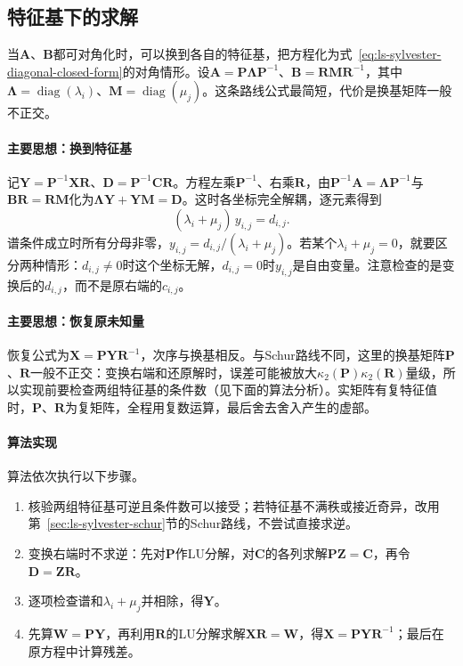 \subsection{特征基下的求解}
\label{sec:ls-sylvester-diagonalizable}

当$\bm A$、$\bm B$都可对角化时，可以换到各自的特征基，把方程化为式~\eqref{eq:ls-sylvester-diagonal-closed-form}的对角情形。设$\bm A=\bm P\bm\Lambda\bm P^{-1}$、$\bm B=\bm R\bm M\bm R^{-1}$，其中$\bm\Lambda=\operatorname{diag}(\lambda_i)$、$\bm M=\operatorname{diag}(\mu_j)$。这条路线公式最简短，代价是换基矩阵一般不正交。

\paragraph{主要思想：换到特征基}
记$\bm Y=\bm P^{-1}\bm X\bm R$、$\bm D=\bm P^{-1}\bm C\bm R$。方程左乘$\bm P^{-1}$、右乘$\bm R$，由$\bm P^{-1}\bm A=\bm\Lambda\bm P^{-1}$与$\bm B\bm R=\bm R\bm M$化为$\bm\Lambda\bm Y+\bm Y\bm M=\bm D$。这时各坐标完全解耦，逐元素得到
\[
 (\lambda_i+\mu_j)\,y_{i,j}=d_{i,j}.
\]
谱条件成立时所有分母非零，$y_{i,j}=d_{i,j}/(\lambda_i+\mu_j)$。若某个$\lambda_i+\mu_j=0$，就要区分两种情形：$d_{i,j}\neq0$时这个坐标无解，$d_{i,j}=0$时$y_{i,j}$是自由变量。注意检查的是变换后的$d_{i,j}$，而不是原右端的$c_{i,j}$。

\paragraph{主要思想：恢复原未知量}
恢复公式为$\bm X=\bm P\bm Y\bm R^{-1}$，次序与换基相反。与Schur路线不同，这里的换基矩阵$\bm P$、$\bm R$一般不正交：变换右端和还原解时，误差可能被放大$\kappa_2(\bm P)\kappa_2(\bm R)$量级，所以实现前要检查两组特征基的条件数（见下面的算法分析）。实矩阵有复特征值时，$\bm P$、$\bm R$为复矩阵，全程用复数运算，最后舍去舍入产生的虚部。

\paragraph{算法实现}
算法依次执行以下步骤。
\begin{enumerate}
 \item 核验两组特征基可逆且条件数可以接受；若特征基不满秩或接近奇异，改用第~\ref{sec:ls-sylvester-schur}节的Schur路线，不尝试直接求逆。
 \item 变换右端时不求逆：先对$\bm P$作LU分解，对$\bm C$的各列求解$\bm P\bm Z=\bm C$，再令$\bm D=\bm Z\bm R$。
 \item 逐项检查谱和$\lambda_i+\mu_j$并相除，得$\bm Y$。
 \item 先算$\bm W=\bm P\bm Y$，再利用$\bm R$的LU分解求解$\bm X\bm R=\bm W$，得$\bm X=\bm P\bm Y\bm R^{-1}$；最后在原方程中计算残差。
\end{enumerate}

